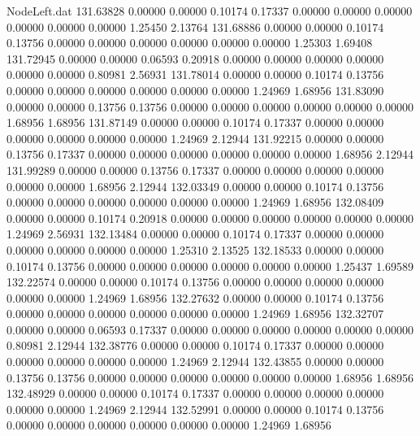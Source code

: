 \begin{filecontents}{NodeLeft.dat}
 131.63828    0.00000    0.00000     0.10174    0.17337    0.00000    0.00000    0.00000    0.00000    0.00000    0.00000    1.25450    2.13764
 131.68886    0.00000    0.00000     0.10174    0.13756    0.00000    0.00000    0.00000    0.00000    0.00000    0.00000    1.25303    1.69408
 131.72945    0.00000    0.00000     0.06593    0.20918    0.00000    0.00000    0.00000    0.00000    0.00000    0.00000    0.80981    2.56931
 131.78014    0.00000    0.00000     0.10174    0.13756    0.00000    0.00000    0.00000    0.00000    0.00000    0.00000    1.24969    1.68956
 131.83090    0.00000    0.00000     0.13756    0.13756    0.00000    0.00000    0.00000    0.00000    0.00000    0.00000    1.68956    1.68956
 131.87149    0.00000    0.00000     0.10174    0.17337    0.00000    0.00000    0.00000    0.00000    0.00000    0.00000    1.24969    2.12944
 131.92215    0.00000    0.00000     0.13756    0.17337    0.00000    0.00000    0.00000    0.00000    0.00000    0.00000    1.68956    2.12944
 131.99289    0.00000    0.00000     0.13756    0.17337    0.00000    0.00000    0.00000    0.00000    0.00000    0.00000    1.68956    2.12944
 132.03349    0.00000    0.00000     0.10174    0.13756    0.00000    0.00000    0.00000    0.00000    0.00000    0.00000    1.24969    1.68956
 132.08409    0.00000    0.00000     0.10174    0.20918    0.00000    0.00000    0.00000    0.00000    0.00000    0.00000    1.24969    2.56931
 132.13484    0.00000    0.00000     0.10174    0.17337    0.00000    0.00000    0.00000    0.00000    0.00000    0.00000    1.25310    2.13525
 132.18533    0.00000    0.00000     0.10174    0.13756    0.00000    0.00000    0.00000    0.00000    0.00000    0.00000    1.25437    1.69589
 132.22574    0.00000    0.00000     0.10174    0.13756    0.00000    0.00000    0.00000    0.00000    0.00000    0.00000    1.24969    1.68956
 132.27632    0.00000    0.00000     0.10174    0.13756    0.00000    0.00000    0.00000    0.00000    0.00000    0.00000    1.24969    1.68956
 132.32707    0.00000    0.00000     0.06593    0.17337    0.00000    0.00000    0.00000    0.00000    0.00000    0.00000    0.80981    2.12944
 132.38776    0.00000    0.00000     0.10174    0.17337    0.00000    0.00000    0.00000    0.00000    0.00000    0.00000    1.24969    2.12944
 132.43855    0.00000    0.00000     0.13756    0.13756    0.00000    0.00000    0.00000    0.00000    0.00000    0.00000    1.68956    1.68956
 132.48929    0.00000    0.00000     0.10174    0.17337    0.00000    0.00000    0.00000    0.00000    0.00000    0.00000    1.24969    2.12944
 132.52991    0.00000    0.00000     0.10174    0.13756    0.00000    0.00000    0.00000    0.00000    0.00000    0.00000    1.24969    1.68956

\end{filecontents}
